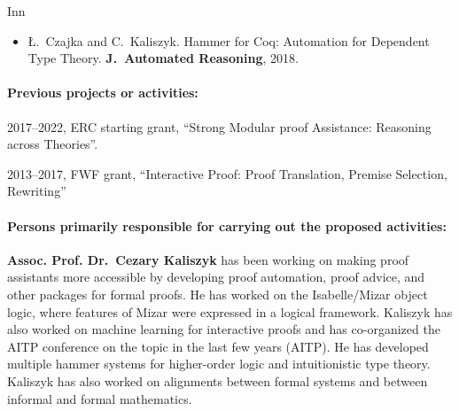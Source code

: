 \begin{sitedescription}{Inn}
\begin{itemize}
\item
Ł.~Czajka and C.~Kaliszyk.
\newblock Hammer for Coq: Automation for Dependent Type Theory.
\textbf{J.~Automated Reasoning}, 2018.
\end{itemize}

\paragraph{Previous projects or activities:}

\begin{compactitem}
\item 2017--2022, ERC starting grant, ``Strong Modular proof Assistance: Reasoning across Theories''.
\item 2013--2017, FWF grant, ``Interactive Proof: Proof Translation, Premise Selection, Rewriting''
\end{compactitem}




\paragraph{Persons primarily responsible for carrying out the proposed activities:}

\textbf{Assoc. Prof. Dr.\ Cezary Kaliszyk} has been working on making proof assistants
more accessible by developing proof automation, proof advice, and other packages for formal
proofs. He has worked on the Isabelle/Mizar object logic, where features of Mizar were
expressed in a logical framework. Kaliszyk has also worked on machine learning for interactive
proofs and has co-organized the AITP conference on the topic in the last few years (AITP). He
has developed multiple hammer systems for higher-order logic and intuitionistic type theory.
Kaliszyk has also worked on alignments between formal systems and between informal and formal
mathematics.



\end{sitedescription}

